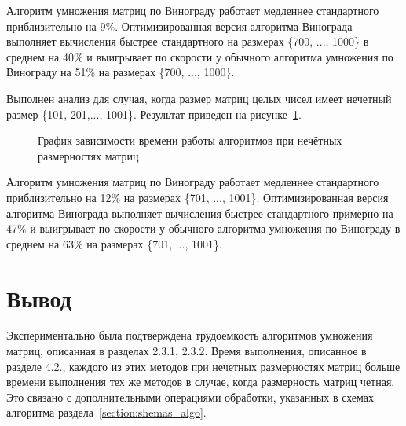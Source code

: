 Алгоритм умножения матриц по Винограду работает медленнее стандартного приблизительно на 9\%. Оптимизированная версия алгоритма Винограда выполняет вычисления быстрее стандартного на размерах \{700, ..., 1000\} в среднем на 40\% и выигрывает по скорости у обычного алгоритма умножения по Винограду на 51\% на размерах \{700, ..., 1000\}.


Выполнен анализ для случая, когда размер матриц целых чисел имеет нечетный размер \{101, 201,..., 1001\}. Результат приведен на рисунке~\ref{fg:6_2}.
\begin{figure}[H]
	\centering
	\caption{График зависимости времени работы алгоритмов при нечётных размерностях матриц} 
	\label{fg:6_2}
\end{figure}
Алгоритм умножения матриц по Винограду работает медленнее стандартного приблизительно на 12\% на размерах \{701, ..., 1001\}. Оптимизированная версия алгоритма Винограда выполняет вычисления быстрее стандартного примерно на 47\% и выигрывает по скорости у обычного алгоритма умножения по Винограду в среднем на 63\% на размерах \{701, ..., 1001\}.


\section*{Вывод}
Экспериментально была подтверждена трудоемкость алгоритмов умножения матриц, описанная в разделах 2.3.1, 2.3.2. Время выполнения, описанное в разделе 4.2., каждого из этих методов при нечетных размерностях матриц больше времени выполнения тех же методов в случае, когда размерность матриц четная. Это связано с дополнительными операциями обработки, указанных в схемах алгоритма раздела~\ref{section:shemas_algo}.
